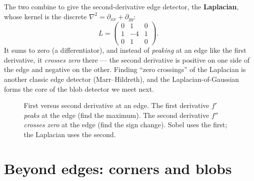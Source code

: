 The two combine to give the second-derivative edge detector, the
\textbf{Laplacian}, whose kernel is the discrete $\nabla^2 = \partial_{xx} +
\partial_{yy}$:
\begin{equation}
\label{ch32:laplacian}
L =
\begin{pmatrix} 0 & 1 & 0 \\ 1 & -4 & 1 \\ 0 & 1 & 0 \end{pmatrix}.
\end{equation}
It sums to zero (a differentiator), and instead of \emph{peaking} at an edge
like the first derivative, it \emph{crosses zero} there --- the second
derivative is positive on one side of the edge and negative on the other.
Finding ``zero crossings'' of the Laplacian is another classic edge detector
(Marr--Hildreth), and the Laplacian-of-Gaussian forms the core of the blob
detector we meet next.

\begin{figure}[H]
\centering
{}
\caption{First versus second derivative at an edge. The first derivative $f'$
\emph{peaks} at the edge (find the maximum). The second derivative $f''$
\emph{crosses zero} at the edge (find the sign change). Sobel uses the first;
the Laplacian uses the second.}
\label{ch32:fig-first-second-deriv}
\end{figure}

\section{Beyond edges: corners and blobs}
\label{ch32:corners-blobs}

